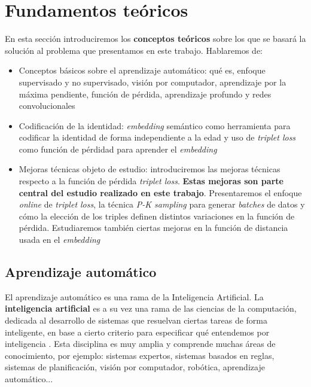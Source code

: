 \chapter{Fundamentos teóricos} \label{ich:fundamentos_teoricos}

En esta sección introduciremos los \textbf{conceptos teóricos} sobre los que se basará la solución al problema que presentamos en este trabajo. Hablaremos de:

\begin{itemize}
    \item Conceptos básicos sobre el aprendizaje automático: qué es, enfoque supervisado y no supervisado, visión por computador, aprendizaje por la máxima pendiente, función de pérdida, aprendizaje profundo y redes convolucionales
    \item Codificación de la identidad: \textit{embedding} semántico como herramienta para codificar la identidad de forma independiente a la edad y uso de \textit{triplet loss} como función de pérdidad para aprender el \textit{embedding}
    \item Mejoras técnicas objeto de estudio: introduciremos las mejoras técnicas respecto a la función de pérdida \textit{triplet loss}. \textbf{Estas mejoras son parte central del estudio realizado en este trabajo}. Presentaremos el enfoque \textit{online} de \textit{triplet loss}, la técnica \textit{P-K sampling} para generar \textit{batches} de datos y cómo la elección de los triples definen distintos variaciones en la función de pérdida. Estudiaremos también ciertas mejoras en la función de distancia usada en el \textit{embedding}
\end{itemize}

\section{Aprendizaje automático}

El aprendizaje automático es una rama de la Inteligencia Artificial. La \textbf{inteligencia artificial} es a su vez una rama de las ciencias de la computación, dedicada al desarrollo de sistemas que resuelvan ciertas tareas de forma inteligente, en base a cierto criterio para especificar qué entendemos por inteligencia \cite{informatica:libro_europa_IA}. Esta disciplina es muy amplia y comprende muchas áreas de conocimiento, por ejemplo: sistemas expertos, sistemas basados en reglas, sistemas de planificación, visión por computador, robótica, aprendizaje automático...

